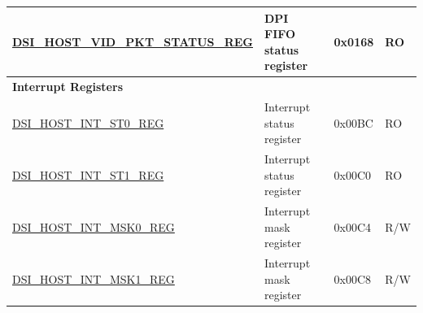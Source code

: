 \begin{longtable}{ | p{6.8cm} | p{6.5cm} | p{1.2cm} | p{1cm} | }
\hyperref[regdesc:DSIHOSTVIDPKTSTATUSREG]{DSI\_HOST\_VID\_PKT\_STATUS\_REG} & DPI FIFO status register & 0x0168 & RO \\ \hline
\multicolumn{4}{|l|}{\textbf{Interrupt Registers}} \\ \hline
\hyperref[regdesc:DSIHOSTINTST0REG]{DSI\_HOST\_INT\_ST0\_REG} & Interrupt status register & 0x00BC & RO \\ \hline
\hyperref[regdesc:DSIHOSTINTST1REG]{DSI\_HOST\_INT\_ST1\_REG} & Interrupt status register & 0x00C0 & RO \\ \hline
\hyperref[regdesc:DSIHOSTINTMSK0REG]{DSI\_HOST\_INT\_MSK0\_REG} & Interrupt mask register & 0x00C4 & R/W \\ \hline
\hyperref[regdesc:DSIHOSTINTMSK1REG]{DSI\_HOST\_INT\_MSK1\_REG} & Interrupt mask register & 0x00C8 & R/W \\ \hline
\end{longtable}
